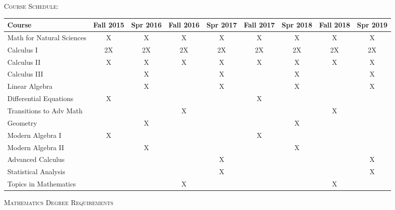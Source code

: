 \documentclass[letterpaper,10pt]{article}
\begin{document}
\newpage

\begin{minipage}[t]{.95\textwidth}
{\scshape  \Large Course Schedule:}\\[5pt]
\setlength{\extrarowheight}{2pt}
\begin{tabular}{ l | c | c | c |c |c |c |c |c |}
Course & Fall 2015 & Spr 2016 & Fall 2016 & Spr 2017 & Fall 2017 & Spr 2018 & Fall 2018 & Spr 2019\\
\hline
\hline
Math for Natural Sciences & X & X & X & X & X & X & X & X\\[2pt]
Calculus I                & 2X & 2X & 2X & 2X & 2X & 2X & 2X & 2X\\[2pt]
Calculus II               & X & X & X & X & X & X & X & X\\[2pt]
Calculus III              &  & X &  & X & & X & & X \\[2pt]
Linear Algebra            &  & X &  & X & & X & & X  \\[2pt]
Differential Equations    & X & & & & X &  &  &  \\[2pt]
Transitions to Adv Math   & & & X & & & & X &  \\[2pt]
Geometry                  & & X & & & & X & &   \\[2pt]
Modern Algebra I          & X & & & & X & & & \\[2pt]
Modern Algebra II         & & X & & & & X & &  \\[2pt]
Advanced Calculus         & & & & X & & & & X \\[2pt]
Statistical Analysis      & & & & X & & & & X \\[2pt]
Topics in Mathematics     & & & X & & & & X &  \\[2pt]
\hline
\end{tabular}
\end{minipage}

\vspace{0.4in}
{\scshape \Large Mathematics Degree Requirements}\\
\end{document}
